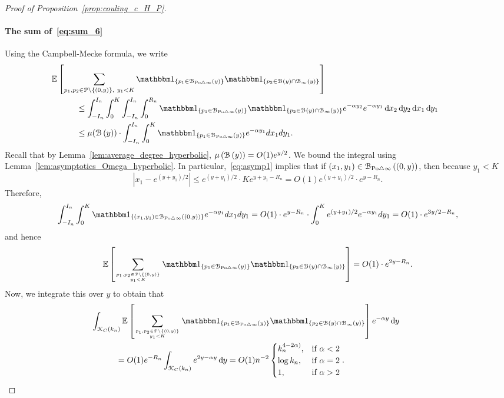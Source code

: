 \begin{proof}[Proof of Proposition~\ref{prop:couling_c_H_P}]
\paragraph{The sum of~\eqref{eq:sum_6}}
Using the Campbell-Mecke formula, we write 
\begin{align*}
	&\hspace{-30pt}\Exp { \sum_{p_1,p_2 \in\Pcal \setminus \{(0,y)\}, \ y_1 < K}
		\ind{p_1\in \BallSym{y}} \ind{p_2\in \BallHyp{y}\cap \BallPo{y}}}\\
	&\leq \int_{-I_n}^{I_n} \int_0^K \int_{-I_n}^{I_n} \int_0^{R_n} 
		\ind{p_1 \in \BallSym{y}} 
 		\ind{p_2 \in \BallHyp{y}\cap \BallPo{y}} e^{-\alpha y_2} e^{-\alpha y_1} \dd x_2 \dd y_2 \dd x_1 \dd y_1 \\
 	&\leq  \mu (\BallHyp{y})\cdot \int_{-I_n}^{I_n} \int_0^K \ind{p_1 \in \BallSym{y}} 
		e^{-\alpha y_1}  dx_1 dy_1.
\end{align*}
Recall that by Lemma~\ref{lem:average_degree_hyperbolic}, $\mu\left({\mathcal B}\left(y\right)\right) =O(1) e^{y/2}$. We bound the integral using Lemma~\ref{lem:asymptotics_Omega_hyperbolic}. In particular,~\eqref{eq:asymp1} implies that if $(x_1,y_1) \in {\mathcal B}_{{\mathrm{Po}} \bigtriangleup \infty}\left((0,y)\right)$, then because $y_1 < K$
\[
	|x_1 - e^{(y+y_1)/2} |\leq e^{(y+y_1)/2} \cdot K e^{y+y_1- R_n} = O(1) 
	e^{(y+y_1)/2} \cdot e^{y- R_n}.
\]
Therefore, 
\[
	\int_{-I_n}^{I_n} \int_0^K \ind{(x_1,y_1) \in \BallSym{(0,y)}} 
	e^{-\alpha y_1}  dx_1 dy_1 = O(1) \cdot e^{y-R_n} 
	\cdot \int_0^K e^{(y+y_1)/2} 
	e^{-\alpha y_1}   dy_1 = O(1)\cdot e^{3y/2 - R_n}, 
\]
and hence
\begin{align*}
	\Exp { \sum_{p_1,p_2 \in\Pcal \setminus \{(0,y)\} \atop y_1 < K}
	\ind{p_1\in \BallSym{y}} \ind{p_2\in \BallHyp{y}\cap \BallPo{y}}} 
	= O(1) \cdot e^{2y - R_n}.
\end{align*}
Now, we integrate this over $y$ to obtain that
\begin{align*}
	&\hspace{-30pt}\int_{\Kcal_{C}(k_n)} \Exp { \sum_{p_1,p_2 \in\Pcal \setminus \{(0,y)\} \atop y_1 < K}
		\ind{p_1\in \BallSym{y}} \ind{p_2\in \BallHyp{y}\cap \BallPo{y}}} e^{-\alpha y} \dd y\\
	&= O(1) e^{-R_n} \int_{\Kcal_{C}(k_n)} e^{2y -\alpha y} \dd y
		= O(1) n^{-2}
			\begin{cases}
			k_n^{4-2\alpha)}, & \mbox{if $\alpha < 2$} \\
			\log k_n, & \mbox{if $\alpha =2$} \\
			1, & \mbox{if $\alpha >2$}
			\end{cases}.
\end{align*}


\end{proof}

